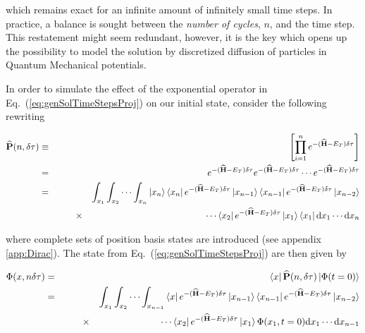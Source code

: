 

which remains exact for an infinite amount of infinitely small time steps. In practice, a balance is sought between the \textit{number of cycles}, $n$, and the time step. This restatement might seem redundant, however, it is the key which opens up the possibility to model the solution by discretized diffusion of particles in Quantum Mechanical potentials. 

In order to simulate the effect of the exponential operator in Eq.~(\ref{eq:genSolTimeStepsProj}) on our initial state,
consider the following rewriting

\begin{eqnarray}
 {\bf\widehat{P}}(n, \delta\tau) &\equiv& \left[\prod_{i=1}^n e^{-({\bf\widehat{H}} - E_T)\delta\tau}\right] \\
  &=& e^{-({\bf\widehat{H}} - E_T)\delta\tau}e^{-({\bf\widehat{H}} - E_T)\delta\tau}\cdots e^{-({\bf\widehat{H}} - E_T)\delta\tau} \\
     &=& \int_{x_1}\int_{x_2}\cdots\int_{x_n} \left| x_n \right>\left< x_n \right| e^{-({\bf\widehat{H}} - E_T)\delta\tau} \left| x_{n-1} \right>\left< x_{n-1} \right|e^{-({\bf\widehat{H}} - E_T)\delta\tau}\left| x_{n-2} \right> \nonumber\\
     &\qquad\qquad\times& \cdots\left< x_2 \right|e^{-({\bf\widehat{H}} - E_T)\delta\tau} \left| x_1 \right>\left< x_1 \right|\mathrm{d}x_{1}\cdots\mathrm{d}x_{n} 
\end{eqnarray}

where complete sets of position basis states are introduced (see appendix \ref{app:Dirac}). The state from Eq.~(\ref{eq:genSolTimeStepsProj}) are then given by

\begin{eqnarray}
 \Phi(x, n\delta\tau) &=& \left< x \right|{\bf\widehat{P}}(n, \delta\tau)\left| \Phi(t=0) \right> \\
                 &=& \int_{x_1}\int_{x_2}\cdots\int_{x_{n-1}}\left< x \right| e^{-({\bf\widehat{H}} - E_T)\delta\tau}
                 \left| x_{n-1} \right>\left< x_{n-1} \right|e^{-({\bf\widehat{H}} - E_T)\delta\tau}\left| x_{n-2} \right> \nonumber\\
                  &\qquad\qquad\times& \cdots\left< x_2 \right|e^{-({\bf\widehat{H}} - E_T)\delta\tau} \left| x_1 \right>\Phi(x_1, t=0)\mathrm{d}x_{1}\cdots\mathrm{d}x_{n-1} 
\end{eqnarray}

